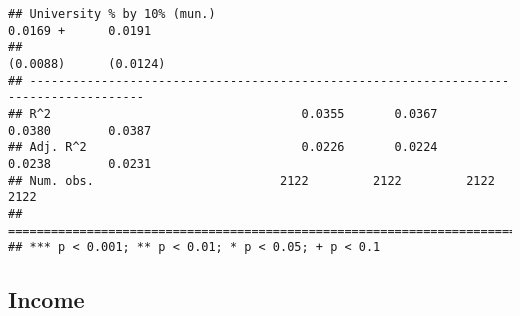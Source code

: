\documentclass[
]{article}
\begin{document}
\begin{verbatim}
## University % by 10% (mun.)                                      0.0169 +      0.0191  
##                                                                (0.0088)      (0.0124) 
## --------------------------------------------------------------------------------------
## R^2                                   0.0355       0.0367       0.0380        0.0387  
## Adj. R^2                              0.0226       0.0224       0.0238        0.0231  
## Num. obs.                          2122         2122         2122          2122       
## ======================================================================================
## *** p < 0.001; ** p < 0.01; * p < 0.05; + p < 0.1
\end{verbatim}

\hypertarget{income-2}{%
\subsection{Income}\label{income-2}}
\end{document}
